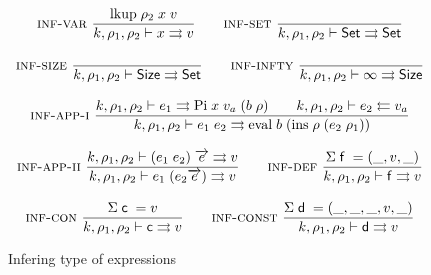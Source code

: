 \begin{figure}[p]
\begin{gather*}
	  \mbox{\sc inf-var}\ \dfrac{\mathrm{lkup} \; \rho_2 \; x \; v}{k,\rho_1,\rho_2\vdash x\rightrightarrows v}
\qquad	  \mbox{\sc inf-set}\ \dfrac{}{k,\rho_1,\rho_2\vdash\mathsf{Set}\rightrightarrows\mathsf{Set}}   
\\[2ex]
	  \mbox{\sc inf-size}\ \dfrac{}{k,\rho_1,\rho_2\vdash\mathsf{Size}\rightrightarrows\mathsf{Set}}
\qquad
	  \mbox{\sc inf-infty}\ \dfrac{}{k,\rho_1,\rho_2\vdash\infty\rightrightarrows\mathsf{Size}} 
\\[2ex]
\mbox{\sc inf-app-i}\ \dfrac{k,\rho_1,\rho_2\vdash e_1\rightrightarrows\mathrm{Pi} \; x \; v_a \; (b \; \rho)
\qquad k,\rho_1,\rho_2\vdash e_2\leftleftarrows v_a}{k,\rho_1,\rho_2\vdash e_1 \; e_2\rightrightarrows\mathrm{eval} \; b \; (\mathrm{ins} \; \rho \; (e_2 \; \rho_1))}
\\[2ex]
\mbox{\sc inf-app-ii}\ \dfrac{k,\rho_1,\rho_2\vdash(e_1 \; e_2)\;\overrightarrow{e}\rightrightarrows v}{k,\rho_1,\rho_2\vdash e_1 \; (e_2 \overrightarrow{e})\rightrightarrows v}
\qquad
\mbox{\sc inf-def}\ \dfrac{\mathrm{\Sigma} \; \mathsf{f} \; = (\_,v,\_) }{k,\rho_1,\rho_2\vdash\mathsf{f}\rightrightarrows v}
\\[2ex]
\mbox{\sc inf-con}\ \dfrac{\mathrm{\Sigma} \; \mathsf{c} \; = v}{k,\rho_1,\rho_2\vdash\mathsf{c}\rightrightarrows v} 
\qquad
\mbox{\sc inf-const}\ \dfrac{\mathrm{\Sigma} \; \mathsf{d} \; = (\_,\_,\_,v,\_)}{k,\rho_1,\rho_2\vdash\mathsf{d}\rightrightarrows v}
\end{gather*}

\caption{Infering type of expressions}
\end{figure}

